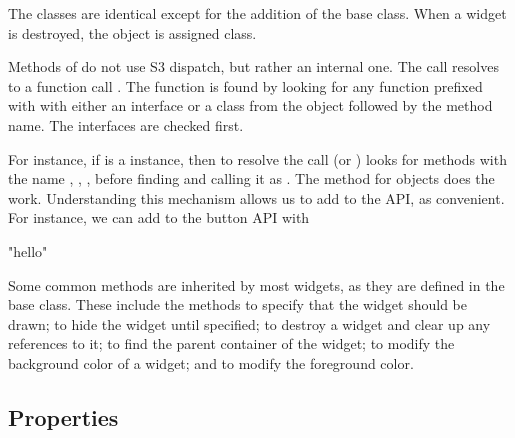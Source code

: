 The classes are identical except for the addition of the base 
class. When a widget is destroyed, the \R\/ object is assigned
 class.

Methods of  do not use S3 dispatch, but rather an internal
one. The call  resolves to a function call
. The function is found by looking for any function
prefixed with with either an interface or a class from the object
followed by the method name. The interfaces are checked first.

For instance, if  is a  instance, then to resolve the call
 (or ) \R\/ looks for methods with the name
, ,
,  before finding
 and calling it as
. The  method for  objects does the
work. Understanding this mechanism allows us to add to the 
API, as convenient. For instance, we can add to the button API with

\begin{Schunk}
\begin{Soutput}
[1] "hello"
\end{Soutput}
\end{Schunk}

Some common methods are inherited by most widgets, as they are defined
in the base  class. These include the methods 
 to specify that the widget should be drawn;
 to hide the widget until specified;
 to destroy a widget and clear up any
references to it;  to find the parent
container of the widget;  to modify the
background color of a widget; and  to
modify the foreground color.


\subsection{Properties}


